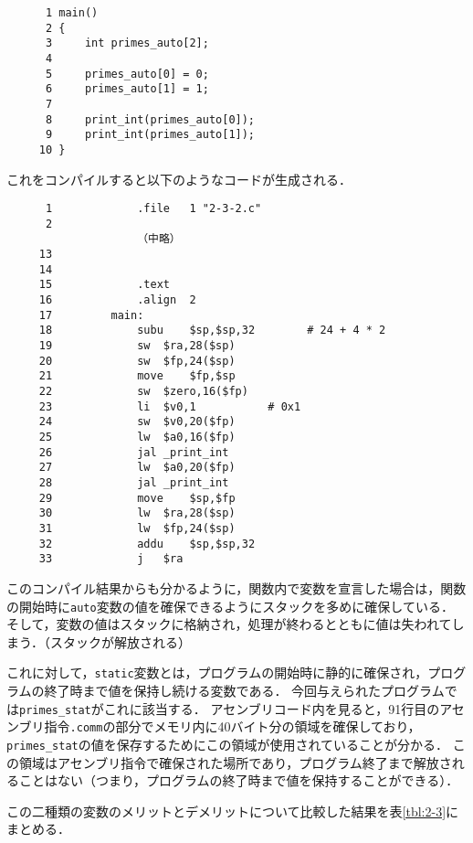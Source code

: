 \documentclass[a4j,11pt]{jarticle}
\begin{document}
\begin{verbatim}
      1	main()
      2	{
      3	    int primes_auto[2];
      4	
      5	    primes_auto[0] = 0;
      6	    primes_auto[1] = 1;
      7	
      8	    print_int(primes_auto[0]);
      9	    print_int(primes_auto[1]);
     10	}
\end{verbatim}

これをコンパイルすると以下のようなコードが生成される．

\begin{verbatim}
      1    		    .file	1 "2-3-2.c"
      2    	
                    （中略）
     13    	
     14    	
     15    		    .text
     16    		    .align	2
     17    	    main:
     18    		    subu	$sp,$sp,32        # 24 + 4 * 2
     19    		    sw	$ra,28($sp)
     20    		    sw	$fp,24($sp)
     21    		    move	$fp,$sp
     22    		    sw	$zero,16($fp)
     23    		    li	$v0,1			# 0x1
     24    		    sw	$v0,20($fp)
     25    		    lw	$a0,16($fp)
     26    		    jal	_print_int
     27    		    lw	$a0,20($fp)
     28    		    jal	_print_int
     29    		    move	$sp,$fp
     30    		    lw	$ra,28($sp)
     31    		    lw	$fp,24($sp)
     32    		    addu	$sp,$sp,32
     33    		    j	$ra
\end{verbatim}

このコンパイル結果からも分かるように，関数内で変数を宣言した場合は，関数の開始時に{\tt auto}変数の値を確保できるようにスタックを多めに確保している．
そして，変数の値はスタックに格納され，処理が終わるとともに値は失われてしまう．（スタックが解放される）

これに対して，{\tt static}変数とは，プログラムの開始時に静的に確保され，プログラムの終了時まで値を保持し続ける変数である．
今回与えられたプログラムでは{\tt primes\_stat}がこれに該当する．
アセンブリコード内を見ると，91行目のアセンブリ指令{\tt .comm}の部分でメモリ内に40バイト分の領域を確保しており，
{\tt primes\_stat}の値を保存するためにこの領域が使用されていることが分かる．
この領域はアセンブリ指令で確保された場所であり，プログラム終了まで解放されることはない（つまり，プログラムの終了時まで値を保持することができる）．

この二種類の変数のメリットとデメリットについて比較した結果を表\ref{tbl:2-3}にまとめる．
\end{document}
